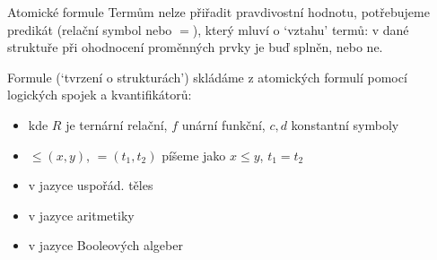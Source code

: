 \documentclass{beamer}
\begin{document}
\begin{frame}{Atomické formule}
    Termům nelze přiřadit \alert{pravdivostní hodnotu}, potřebujeme \alert{predikát} (relační symbol nebo $=$), který mluví \alert{o `vztahu' termů}:  \pause v dané struktuře při ohodnocení proměnných prvky je buď splněn, nebo ne. \pause 

    \medskip

    \alert{Formule} (`tvrzení o strukturách') skládáme z \alert{atomických formulí} pomocí  logických spojek a kvantifikátorů:   \pause 

    \medskip


    \medskip

    \begin{itemize}
        \item {} kde $R$ je ternární relační, $f$ unární funkční, $c,d$ konstantní symboly \pause 
            \item {} $\leq(x,y)$, $=(t_1,t_2)$ píšeme jako $x\leq y$, $t_1=t_2$ \pause 
        \item {} v jazyce uspořád. těles \pause 
        \item {} v jazyce aritmetiky \pause 
        \item {} v jazyce Booleových algeber    
    \end{itemize} 
    
\end{frame}
\end{document}
